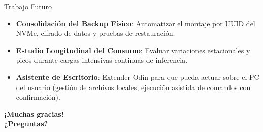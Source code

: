 \documentclass[11pt]{beamer}
\begin{document}
\begin{frame}{Trabajo Futuro}
  \begin{itemize}
    \item \textbf{Consolidación del Backup Físico}: Automatizar el montaje por UUID del NVMe, cifrado de datos y pruebas de restauración.
    \item \textbf{Estudio Longitudinal del Consumo}: Evaluar variaciones estacionales y picos durante cargas intensivas continuas de inferencia.
    \item \textbf{Asistente de Escritorio}: Extender Odín para que pueda actuar sobre el PC del usuario (gestión de archivos locales, ejecución asistida de comandos con confirmación).
  \end{itemize}
  \begin{center}
    \Huge \bfseries ¡Muchas gracias!\\
    \large ¿Preguntas?
  \end{center}
\end{frame}
\end{document}
